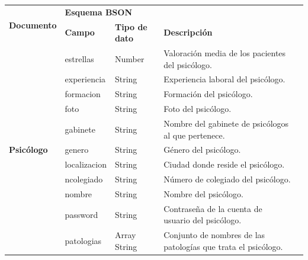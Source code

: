 \begin{table}[htpb]
\centering
\begin{tabularx}{\textwidth}{|l|X|X|X|X|}
\hline
\multirow{2}{*}{\textbf{Documento}}   & \multicolumn{3}{l|}{\textbf{Esquema BSON}}                                                             \\ \cline{2-4} 
                                      & \textbf{Campo} & \textbf{Tipo de dato} & \textbf{Descripción}                                          \\ \hline
\multirow{15}{*}{\textbf{Psicólogo}} & estrellas      & Number                & Valoración media de los pacientes del psicólogo.              \\ \cline{2-4} 
                                      & experiencia    & String                & Experiencia laboral del psicólogo.                            \\ \cline{2-4} 
                                      & formacion      & String                & Formación del psicólogo.                                      \\ \cline{2-4} 
                                      & foto           & String                & Foto del psicólogo.                                           \\ \cline{2-4} 
                                      & gabinete       & String                & Nombre del gabinete de psicólogos al que pertenece.           \\ \cline{2-4} 
                                      & genero         & String                & Género del psicólogo.                                         \\ \cline{2-4} 
                                      & localizacion   & String                & Ciudad donde reside el psicólogo.                             \\ \cline{2-4} 
                                      & ncolegiado     & String                & Número de colegiado del psicólogo.                            \\ \cline{2-4} 
                                      & nombre         & String                & Nombre del psicólogo.                                         \\ \cline{2-4} 
                                      & password       & String                & Contraseña de la cuenta de usuario del psicólogo.             \\ \cline{2-4} 
                                      & patologias     & Array String          & Conjunto de nombres de las patologías que trata el psicólogo. \\ \cline{2-4} 

\end{tabularx}
\end{table}
